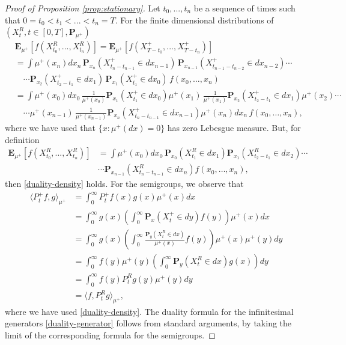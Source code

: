 \documentclass[11pt,a4paper]{article}
\theoremstyle{definition}
\theoremstyle{remark}
\begin{document}
	\begin{proof}[Proof of Proposition \ref{prop:stationary}]
		Let \(t_0,..., t_n\) be a sequence of times such that \(0=t_0 < t_1 <...<t_n=T\). For the finite dimensional distributions of \((X^R_t , t \in [0,T], \mathbf{P}_{\mu^+})\)
		\begin{align*}
			&\mathbf{E}_{\mu^+}[f(X^R_{t_0},..., X^R_{t_n})]=\mathbf{E}_{\mu^+}[f(X^+_{T-t_0},..., X^+_{T-t_n})]\\
			&= \int \mu^+(x_n) dx_n \, \mathbf{P}_{x_n}(X^+_{t_n - t_{n-1}} \in dx_{n-1}) \,
			\mathbf{P}_{x_{n-1}}(X^+_{t_{n-1} - t_{n-2}} \in dx_{n-2}) \cdots \\
			&\quad \cdots \mathbf{P}_{x_2}(X^+_{t_2 - t_1} \in dx_1) \,
			\mathbf{P}_{x_1}(X^+_{t_1} \in dx_0) \, f(x_0, \ldots, x_n) \\
			&= \int \mu^+(x_0) dx_0 \, \frac{1}{\mu^+(x_0)} \mathbf{P}_{x_1}(X^+_{t_1} \in dx_0) \mu^+(x_1) \, \frac{1}{\mu^+(x_1)} \mathbf{P}_{x_2}(X^+_{t_2 - t_1} \in dx_1) \mu^+(x_2) \cdots \\
			&\quad \cdots  \mu^+(x_{n-1}) \, \frac{1}{\mu^+(x_{n-1})} \mathbf{P}_{x_n}(X^+_{t_n - t_{n-1}} \in dx_{n-1}) \mu^+(x_n) dx_n \, f(x_0, \ldots, x_n),
		\end{align*}
		where we have used that \(\{x : \mu^+(dx)=0\} \) has zero Lebesgue measure. But, for definition 
		\begin{align*}
			\mathbf{E}_{\mu^+}[f(X^R_{t_0},..., X^R_{t_n})]&= \int \mu^+(x_0) dx_0 \, 
			\mathbf{P}_{x_0}(X^R_{t_1} \in dx_1) 
			\mathbf{P}_{x_1}(X^R_{t_2 - t_1} \in dx_2) \cdots \\
			&\cdots  
			\mathbf{P}_{x_{n-1}}(X^R_{t_n - t_{n-1}} \in dx_n) 
			f(x_0, \ldots, x_n),
		\end{align*}
		then \eqref{duality-density} holds. For the semigroups, we observe that
		\begin{align*}
			\langle P^+_t f , g \rangle_{\mu^+} &= \int_0^\infty P^+_t f(x) g(x) \mu^+(x) dx\\
			&=\int_0^\infty g(x) \left(\int_0^\infty \mathbf{P}_x (X^+_t \in dy) f(y) \right) \mu^+(x) dx\\
			&=\int_0^\infty g(x) \left(\int_0^\infty \frac{\mathbf{P}_y (X^R_t \in dx)}{\mu^+(x)} f(y) \right) \mu^+(x) \mu^+(y) dy\\
			&= \int_0^\infty f(y) \mu^+(y)\left( \int_0^\infty \mathbf{P}_y(X^R_t \in dx) g(x) \right) dy\\
			&=\int_0^\infty f(y) P^R_t g(y) \mu^+(y) dy\\
			&=\langle  f , P^R_t g \rangle_{\mu^+},
		\end{align*}
		where we have used \eqref{duality-density}. The duality formula for the infinitesimal generators \eqref{duality-generator} follows from standard arguments, by taking the limit of the corresponding formula for the semigroups.
	\end{proof}
\end{document}
